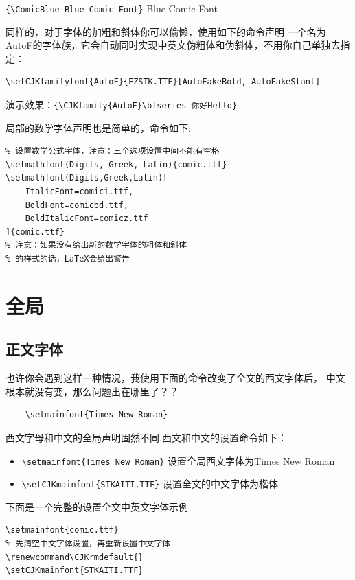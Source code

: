\documentclass[12pt]{article}
\begin{document}
\verb|{\ComicBlue Blue Comic Font}| \faLongArrowAltRight\; {\ComicBlue Blue Comic Font}

 同样的，对于字体的加粗和斜体你可以偷懒，使用如下的命令声明
一个名为AutoF的字体族，它会自动同时实现中英文伪粗体和伪斜体，不用你自己单独去指定：
\begin{lstlisting}
\setCJKfamilyfont{AutoF}{FZSTK.TTF}[AutoFakeBold, AutoFakeSlant]    
\end{lstlisting}

演示效果：\verb|{\CJKfamily{AutoF}\bfseries 你好Hello}| 


局部的数学字体声明也是简单的，命令如下:
\begin{lstlisting}
% 设置数学公式字体，注意：三个选项设置中间不能有空格
\setmathfont(Digits, Greek, Latin){comic.ttf}
\setmathfont(Digits,Greek,Latin)[
    ItalicFont=comici.ttf,
    BoldFont=comicbd.ttf,
    BoldItalicFont=comicz.ttf
]{comic.ttf}
% 注意：如果没有给出新的数学字体的粗体和斜体
% 的样式的话，LaTeX会给出警告
\end{lstlisting}



\clearpage
\section{全局}
\subsection{正文字体}
 也许你会遇到这样一种情况，我使用下面的命令改变了全文的西文字体后，
中文根本就没有变，那么问题出在哪里了？？
\begin{lstlisting}
    \setmainfont{Times New Roman}
\end{lstlisting}
西文字母和中文的全局声明固然不同,西文和中文的设置命令如下：
\begin{itemize}
    \item \verb|\setmainfont{Times New Roman}| \faLongArrowAltRight 设置全局西文字体为Times New Roman
    \item \verb|\setCJKmainfont{STKAITI.TTF}| \faLongArrowAltRight 设置全文的中文字体为楷体
\end{itemize}


下面是一个完整的设置全文中英文字体示例
\begin{lstlisting}
\setmainfont{comic.ttf}
% 先清空中文字体设置，再重新设置中文字体
\renewcommand\CJKrmdefault{}
\setCJKmainfont{STKAITI.TTF} 
\end{lstlisting}
\end{document}

